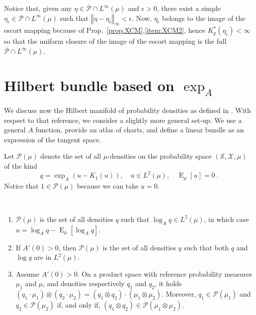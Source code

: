 \documentclass[graybox]{svmult}
\DeclareMathOperator{\Expectation}{E}
\newcommand{\expectat}[2]{{\Expectation}_{#1}\left[#2\right]}
\newcommand{\normat}[2]{\left\Vert#2\right\Vert_{#1}}
\begin{document}
Notice that, given any $\eta \in \overline{\mathcal P} \cap L^\infty(\mu)$ and $\epsilon > 0$, there exist a simple $\eta_\epsilon \in \mathcal P \cap L^\infty(\mu)$ such that $\normat \infty {\eta-\eta_\epsilon} < \epsilon$. Now, $\eta_\epsilon$ belongs to the image of the escort mapping because of Prop.~\ref{prop:XCM}.\ref{item:XCM2}, hence $K_p^*(\eta_\epsilon) < \infty$ so that the uniform closure of the image of the escort mapping is the full $\overline{\mathcal P}\cap L^\infty(\mu)$.

\section{Hilbert bundle based on $\exp_A$}
\label{sec:riem-manif-based}

We discuss now the Hilbert manifold of probability densities as defined in \cite{newton:2012}. With respect to that reference, we consider a slightly more general set-up. We use a general $A$ function, provide an atlas of charts, and define a linear bundle as an expression of the tangent space.

Let $\mathcal{P}(\mu )$ denote the set of all $\mu $-densities on the
probability space $(\mathbb{X},\mathcal{X},\mu )$ of the kind 
\begin{equation}\label{eq:Pmu}
q=\exp _{A}(u-K_{1}(u)),\quad u\in L^{2}(\mu ),\quad {\Expectation}_{\mu }\left[ u
\right] =0 \ .
\end{equation}
Notice that $1\in \mathcal{P}(\mu )$ because we can 
take $u=0$.

\begin{proposition}\ 
  \begin{enumerate}
  \item $\mathcal{P}(\mu )$ is the set of all densities $q$ such that $\log _{A}q\in L^{2}(\mu )$, in which case $u = \log_A q - \expectat \mu {\log_A q}$.
  \item If $A'(0)>0$, then $\mathcal{P}(\mu )$ is the set of all densities $q$ such that both $q$ and $\log q$ are in $L^{2}(\mu )$. 
  \item Assume $A'(0) > 0$. On a product space with reference probability measures $\mu_1$ and $\mu$, and densities respectively $q_1$ and $q_2$, it holds $(q_1\cdot\mu_1)\otimes(q_2\cdot\mu_2) = (q_1\otimes q_2) \cdot (\mu_1 \otimes \mu_2)$. Moreover, $q_1 \in \mathcal P(\mu_1)$ and $q_2 \in \mathcal P(\mu_2)$ if, and only if, $(q_1 \otimes q_2) \in \mathcal P(\mu_1 \otimes \mu_2)$. 
  \end{enumerate}
\end{proposition}
\end{document}
